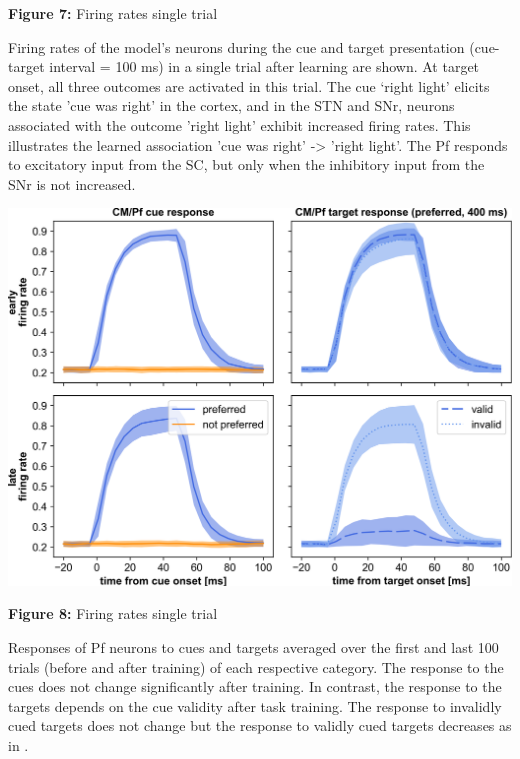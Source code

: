 \documentclass[portrait,final,a0paper,fontscale=0.30]{baposter}
\begin{document}
\begin{poster}
{\begin{adjustbox}{minipage=\textwidth, margin=2pt, center}
\begin{minipage}{0.26\textwidth}
        \textbf{Figure 7:} Firing rates single trial
	\end{minipage}
    \hspace{0.01\textwidth}
	\begin{minipage}{0.18\textwidth}
        Firing rates of the model’s neurons during the cue and target presentation (cue-target interval = 100 ms) in a single trial after learning are shown. At target onset, all three outcomes are activated in this trial. The cue ‘right light’ elicits the state 'cue was right' in the cortex, and in the STN and SNr, neurons associated with the outcome 'right light' exhibit increased firing rates. This illustrates the learned association 'cue was right' -> 'right light'. The Pf responds to excitatory input from the SC, but only when the inhibitory input from the SNr is not increased.
	\end{minipage}
    \hspace{0.05\textwidth}
	\begin{minipage}{0.48\textwidth}  
        \begin{center}
            \includegraphics[width=0.75\linewidth]{figures/pf_response.png}
            
            \textbf{Figure 8:} Firing rates single trial \\
        \end{center}
        \vspace{5pt}
        Responses of Pf neurons to cues and targets averaged over the first and last 100 trials (before and after training) of each respective category. The response to the cues does not change significantly after training. In contrast, the response to the targets depends on the cue validity after task training. The response to invalidly cued targets does not change but the response to validly cued targets decreases as in \parencite{minamimoto_participation_2002}.
	\end{minipage}
    \hfill
  

\end{adjustbox}}
\end{poster}
\end{document}
